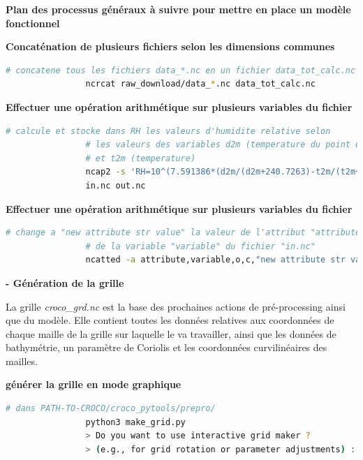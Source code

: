 \documentclass[10pt,a4paper,titlepage]{article}
\begin{document}
\begin{processEnv}{\textbf{Plan des processus généraux à suivre pour mettre en place un modèle fonctionnel}}
        \begin{codeEnv}{\textbf{Concaténation de plusieurs fichiers selon les dimensions communes}}
            \begin{lstlisting}[language=bash]
                # concatene tous les fichiers data_*.nc en un fichier data_tot_calc.nc
                ncrcat raw_download/data_*.nc data_tot_calc.nc
            \end{lstlisting}
        \end{codeEnv}
        
        \begin{codeEnv}{\textbf{Effectuer une opération arithmétique sur plusieurs variables du fichier}}
            \begin{lstlisting}[language=bash]
                # calcule et stocke dans RH les valeurs d'humidite relative selon
                # les valeurs des variables d2m (temperature du point de rosee)
                # et t2m (temperature)
                ncap2 -s 'RH=10^(7.591386*(d2m/(d2m+240.7263)-t2m/(t2m+240.7263)))'\
                in.nc out.nc
            \end{lstlisting}
        \end{codeEnv}
        
        \begin{codeEnv}{\textbf{Effectuer une opération arithmétique sur plusieurs variables du fichier}}
            \begin{lstlisting}[language=bash]
                # change a "new attribute str value" la valeur de l'attribut "attribute"
                # de la variable "variable" du fichier "in.nc"
                ncatted -a attribute,variable,o,c,"new attribute str value" in.nc
            \end{lstlisting}
        \end{codeEnv}
        
        \textbf{- Génération de la grille}
        
        La grille \textit{croco\_grd.nc} est la base des prochaines actions de pré-processing ainsi que du modèle. Elle contient toutes les données relatives aux coordonnées de chaque maille de la grille sur laquelle le va travailler, ainsi que les données de bathymétrie, un paramètre de Coriolis et les coordonnées curvilinéaires des mailles.
        
        \begin{codeEnv}{\textbf{générer la grille en mode graphique}}
            \begin{lstlisting}[language=bash]
                # dans PATH-TO-CROCO/croco_pytools/prepro/
                python3 make_grid.py
                > Do you want to use interactive grid maker ?
                > (e.g., for grid rotation or parameter adjustments) : y,[n] y
            \end{lstlisting}
        \end{codeEnv}
        

\end{processEnv}
\end{document}
